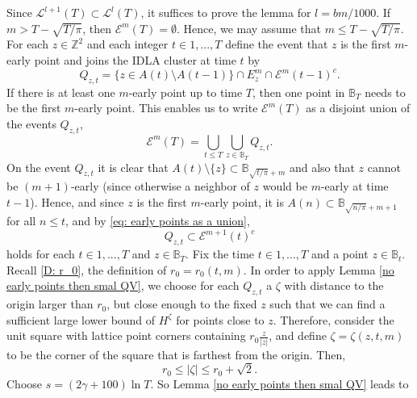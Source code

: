 \documentclass[11pt]{article}
\makeatletter
\renewenvironment{proof}[1][\proofname]{
   \par\pushQED{\qed}\normalfont
   \topsep6\p@\@plus6\p@\relax
   \trivlist\item[\hskip\labelsep\bfseries#1\@addpunct{.}]
   \ignorespaces
}{
   \popQED\endtrivlist\@endpefalse
}
\numberwithin{equation}{section}
\makeatother
\begin{document}
\begin{proof}[Proof of Lemma \ref{Early Points Imply Late Points}]
  \renewcommand{\qedsymbol}{}
  Since $\mathcal{L}^{l+1}(T) \subset \mathcal{L}^{l}(T)$,
  it suffices to prove the lemma for \mbox{$l=b m /1000$}. 
  If $m > T - \sqrt{T/ \pi}$, then 
  $\mathcal{E}^m(T) = \emptyset$. 
  Hence, we may assume that $m \leq T - \sqrt{T/ \pi}$.
  For each $z \in \mathbb{Z}^2$ and each
  integer $t \in 1,...,T$ define the event that $z$ is the first 
  $m$-early point and joins the IDLA cluster at time $t$ by
  $$
  Q_{z,t} = \{ z \in A(t) \setminus A(t-1) \} \cap
            E^m_z \cap
            \mathcal{E}^m(t-1)^c.
  $$
  If there is at least one $m$-early point up to time $T$,
  then one point in $\mathbb{B}_T$ needs to be the first 
  $m$-early point. This enables us to write 
  $\mathcal{E}^m(T)$ 
  as a disjoint union of the events $Q_{z,t}$,
  \begin{equation}
    \label{eq: partition Em}
    \mathcal{E}^m(T) =
    \bigcup_{t \leq T} \bigcup_{z \in \mathbb{B}_T} Q_{z,t}.
  \end{equation}
  On the event $Q_{z,t}$ it is clear that 
  $A(t) \setminus \{z\} \subset \mathbb{B}_{\sqrt{t/\pi} + m}$
  and also that $z$ cannot be $(m+1)$-early
  (since otherwise a neighbor of $z$ would be $m$-early at time $t-1$).
  Hence, and since $z$ is the first $m$-early point, it is 
  $A(n) \subset \mathbb{B}_{\sqrt{n/\pi}+m+1}$ for all $n \leq t$, 
  and by \eqref{eq: early points as a union},
  \begin{equation}
    \label{eq: Q subset E_m}
      Q_{z,t} \subset \mathcal{E}^{m+1}(t)^c
  \end{equation}
  holds for each $t \in 1,...,T$ and $z \in \mathbb{B}_T$. 
  Fix the time $t \in 1,...,T$ and a point $z \in \mathbb{B}_t$.
  Recall \eqref{D: r_0}, the definition of $r_0 = r_0(t,m)$.
  In order to apply Lemma \ref{no early points then smal QV}, 
  we choose for each $Q_{z,t}$ a $\zeta$ with distance to the origin larger than $r_0$, 
  but close enough to the fixed $z$ such that we can find a 
  sufficient large lower bound of $H^{\zeta}$
  for points close to $z$. Therefore, 
  consider the unit square with lattice point corners containing 
  $r_0 \frac{z}{|z|}$, and define $\zeta = \zeta(z,t,m)$ to 
  be the corner of the square that is farthest from the origin. Then,
  $$
  r_0 \leq |\zeta| \leq r_0 + \sqrt{2}.
  $$
  Choose $s= (2 \gamma + 100) \ln T$.
  So Lemma \ref{no early points then smal QV} leads to 
  \begin{equation} \label{eq: bound QV on Q}

\end{equation}
\end{proof}
\end{document}
